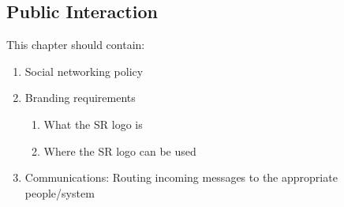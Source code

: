 \begin{draft}
\chapter{Public Interaction}

This chapter should contain:
\begin{enumerate}
\item Social networking policy
\item Branding requirements
  \begin{enumerate}
  \item What the SR logo is
  \item Where the SR logo can be used
  \end{enumerate}
\item Communications: Routing incoming messages to the appropriate people/system
\end{enumerate}
\end{draft}
